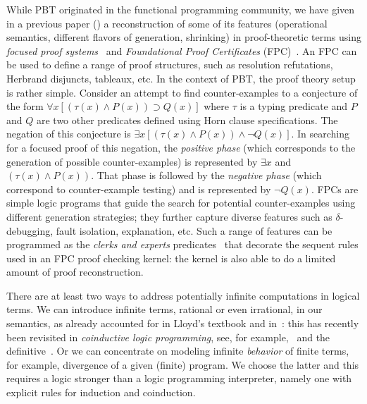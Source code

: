 \documentclass[submission,copyright,creativecommons]{eptcs}
\begin{document}
While PBT originated in the functional programming community, we have
given in a previous paper (\cite{Blanco0M19}) a reconstruction of some
of its features (operational semantics, different flavors of
generation, shrinking) in proof-theoretic terms using \emph{focused
  proof systems}~\cite{andreoli92jlc,liang09tcs} and
\emph{Foundational Proof Certificates} (FPC)~\cite{chihani17jar}.  An
FPC can be used to define a range of proof structures, such as
resolution refutations, Herbrand disjuncts, tableaux, etc.
%
In the context of PBT, the proof theory setup is rather simple.
Consider an attempt to find counter-examples to a conjecture of the
form \(\forall x [(\tau(x)\wedge P(x)) \supset Q(x)]\) where $\tau$ is
a typing predicate and $P$ and $Q$ are two other predicates defined
using Horn clause specifications.
%
The negation of this conjecture is
\(\exists x [(\tau(x)\land P(x)) \land \neg Q(x)]\).
%
In searching for a focused proof of this negation, the \emph{positive
  phase} (which corresponds to the generation of possible
counter-examples) is represented by \(\exists x\) and \((\tau(x)\land
P(x))\).
%
That phase is followed by the \emph{negative phase} (which correspond
to counter-example testing) and is represented by \(\neg Q(x)\).
%
FPCs are simple logic programs that guide the search for potential
counter-examples using different generation strategies; they further
capture diverse features such as $\delta$-debugging, fault isolation,
explanation, etc.  Such a range of features can be programmed as the
\emph{clerks and experts} predicates~\cite{chihani17jar} that decorate
the sequent rules used in an FPC proof checking kernel: the kernel is
also able to do a limited amount of proof reconstruction.


%
There are at least two ways to address potentially infinite
computations in logical terms. We can introduce infinite terms,
rational or even irrational, in our semantics, as already accounted
for in Lloyd's textbook and in~\cite{maher88lics}: %
this has recently
been revisited in \emph{coinductive logic programming}, see, for
example,~\cite{Luke07} and the definitive~\cite{BasoldKL19}. Or we can
concentrate on modeling infinite \emph{behavior} of finite terms, for
example, divergence of a given (finite) program. We choose the latter and this requires a
logic stronger than a logic programming interpreter, namely one with explicit rules for induction and coinduction.
\end{document}
